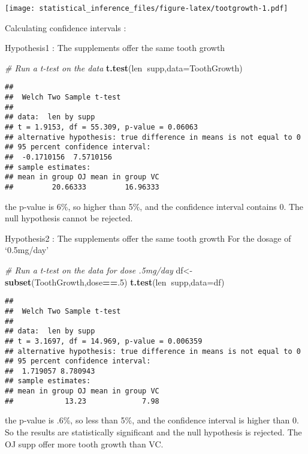 \documentclass[
]{article}
\newenvironment{Shaded}{\begin{snugshade}}{\end{snugshade}}
\newcommand{\CommentTok}[1]{\textcolor[rgb]{0.56,0.35,0.01}{\textit{#1}}}
\newcommand{\DataTypeTok}[1]{\textcolor[rgb]{0.13,0.29,0.53}{#1}}
\newcommand{\DecValTok}[1]{\textcolor[rgb]{0.00,0.00,0.81}{#1}}
\newcommand{\KeywordTok}[1]{\textcolor[rgb]{0.13,0.29,0.53}{\textbf{#1}}}
\newcommand{\NormalTok}[1]{#1}
\newcommand{\OperatorTok}[1]{\textcolor[rgb]{0.81,0.36,0.00}{\textbf{#1}}}
\begin{document}
\texttt{[image: statistical\_inference\_files/figure-latex/tootgrowth-1.pdf]}

Calculating confidence intervals :

Hypothesis1 : The supplements offer the same tooth growth

\begin{Shaded}
\begin{Highlighting}[]
\CommentTok{# Run a t-test on the data}
\KeywordTok{t.test}\NormalTok{(len}\OperatorTok{~}\NormalTok{supp,}\DataTypeTok{data=}\NormalTok{ToothGrowth)}
\end{Highlighting}
\end{Shaded}

\begin{verbatim}
## 
##  Welch Two Sample t-test
## 
## data:  len by supp
## t = 1.9153, df = 55.309, p-value = 0.06063
## alternative hypothesis: true difference in means is not equal to 0
## 95 percent confidence interval:
##  -0.1710156  7.5710156
## sample estimates:
## mean in group OJ mean in group VC 
##         20.66333         16.96333
\end{verbatim}

the p-value is 6\%, so higher than 5\%, and the confidence interval
contains 0. The null hypothesis cannot be rejected.

Hypothesis2 : The supplements offer the same tooth growth For the dosage
of `0.5mg/day'

\begin{Shaded}
\begin{Highlighting}[]
\CommentTok{# Run a t-test on the data for dose .5mg/day}
\NormalTok{df<-}\KeywordTok{subset}\NormalTok{(ToothGrowth,dose}\OperatorTok{==}\NormalTok{.}\DecValTok{5}\NormalTok{)}
\KeywordTok{t.test}\NormalTok{(len}\OperatorTok{~}\NormalTok{supp,}\DataTypeTok{data=}\NormalTok{df)}
\end{Highlighting}
\end{Shaded}

\begin{verbatim}
## 
##  Welch Two Sample t-test
## 
## data:  len by supp
## t = 3.1697, df = 14.969, p-value = 0.006359
## alternative hypothesis: true difference in means is not equal to 0
## 95 percent confidence interval:
##  1.719057 8.780943
## sample estimates:
## mean in group OJ mean in group VC 
##            13.23             7.98
\end{verbatim}

the p-value is .6\%, so less than 5\%, and the confidence interval is
higher than 0. So the results are statistically significant and the null
hypothesis is rejected. The OJ supp offer more tooth growth than VC.
\end{document}
